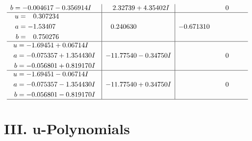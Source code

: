 \documentclass[1p]{elsarticle_modified}
\theoremstyle{definition}
\begin{document}
$$\begin{array}{c|c|c}
\begin{aligned}
b &= -0.004617 - 0.356914 I\end{aligned}
 & \phantom{-}2.32739 + 4.35402 I & \phantom{-0.000000 } 0 \\ \hline\begin{aligned}
u &= \phantom{-}0.307234\phantom{ +0.000000I} \\
a &= -1.53407\phantom{ +0.000000I} \\
b &= \phantom{-}0.750276\phantom{ +0.000000I}\end{aligned}
 & \phantom{-}0.240630\phantom{ +0.000000I} & -0.671310\phantom{ +0.000000I} \\ \hline\begin{aligned}
u &= -1.69451 + 0.06714 I \\
a &= -0.075357 + 1.354430 I \\
b &= -0.056801 + 0.819170 I\end{aligned}
 & -11.77540 - 0.34750 I & \phantom{-0.000000 } 0 \\ \hline\begin{aligned}
u &= -1.69451 - 0.06714 I \\
a &= -0.075357 - 1.354430 I \\
b &= -0.056801 - 0.819170 I\end{aligned}
 & -11.77540 + 0.34750 I & \phantom{-0.000000 } 0\\
 \hline 
 \end{array}$$\newpage
\newpage\renewcommand{\arraystretch}{1}
\centering \section*{ III. u-Polynomials}
\end{document}
